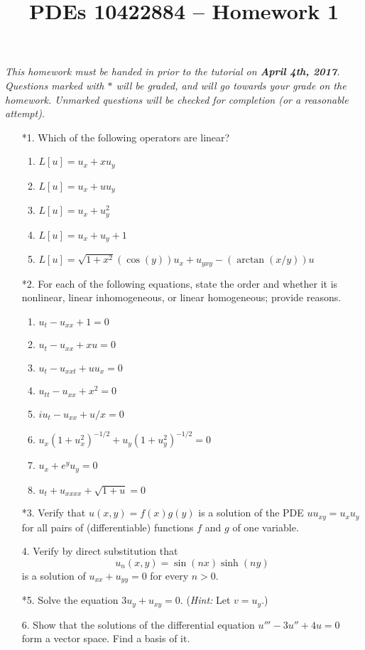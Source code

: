 \documentclass[10pt,a4paper]{article}
\title{PDEs 10422884 -- Homework 1}
\date{}
\begin{document}
\maketitle
\textsl{ This homework must be handed in prior to the tutorial on \textbf{April 4th, 2017}. Questions marked with $*$ will be graded, and will go towards your grade on the homework. Unmarked questions will be checked for completion (or a reasonable attempt).}

\begin{enumerate}
\item[*1.] Which of the following operators are linear?
\begin{enumerate}
\item $L[u] = u_x + xu_y$
\item $L[u] = u_x + uu_y$
\item $L[u] = u_x + u_y^2$
\item $L[u] = u_x +u_y + 1$
\item $L[u] = \sqrt{1+x^2} (\cos(y)) u_x + u_{yxy} - (\arctan(x/y)) u$
\end{enumerate}

\item[*2.] For each of the following equations, state the order and whether it is nonlinear, linear inhomogeneous, or linear homogeneous; provide reasons.
\begin{enumerate}
\item $u_t - u_{xx} + 1 = 0$
\item $u_t - u_{xx} + xu = 0$
\item $u_t - u_{xxt} + uu_x = 0$
\item $u_{tt} - u_{xx} + x^2 = 0$
\item $i u_t - u_{xx} + u/x = 0$
\item $u_x(1+u_x^2)^{-1/2} + u_y(1+u_y^2)^{-1/2} = 0$
\item $u_x + e^y u_y = 0$
\item $u_t + u_{xxxx} + \sqrt{1+u} = 0$
\end{enumerate}

\item[*3.] Verify that $u(x,y) = f(x)g(y)$ is a solution of the PDE $uu_{xy} = u_x u_y$ for all pairs of (differentiable) functions $f$ and $g$ of one variable.

\item[4.] Verify by direct substitution that 
\[ u_n(x,y) = \sin(nx)\sinh(ny) \]
is a solution of $u_{xx} + u_{yy} = 0$ for every $n > 0.$

\item[*5.] Solve the equation $3u_y + u_{xy} = 0.$ (\emph{Hint:} Let $v = u_y.$)

\item[6.] Show that the solutions of the differential equation $u''' - 3u'' + 4u = 0$ form a vector space. Find a basis of it.

\end{enumerate}
\end{document}
